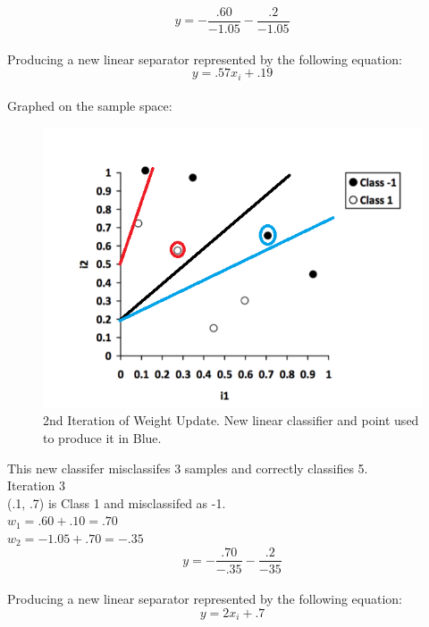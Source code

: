 \documentclass[12pt]{article}
\begin{document}
\begin{equation}
y = -\frac{.60}{-1.05} - \frac{.2}{-1.05}
\end{equation}\\
Producing a new linear separator represented by the following equation:\\
\begin{equation}
y = .57x_i + .19
\end{equation}\\
Graphed on the sample space: \\
\begin{figure}[H]
    \centering
    \includegraphics[width=1\textwidth]{question_4_plot_a_it2}
    \caption{2nd Iteration of Weight Update. New linear classifier and point used to produce it in Blue.}
    \label{fig:question_4_plot_a_it2}
\end{figure}
This new classifer misclassifes 3 samples and correctly classifies 5.\\
Iteration 3 \\
(.1, .7) is Class 1 and misclassifed as -1.\\
$w_1 = .60+.10 = .70$\\
$w_2= -1.05+.70= -.35$\\
\begin{equation}
y = -\frac{.70}{-.35} - \frac{.2}{-35}
\end{equation}\\
Producing a new linear separator represented by the following equation:\\
\begin{equation}
y = 2x_i + .7
\end{equation}\\
\end{document}
